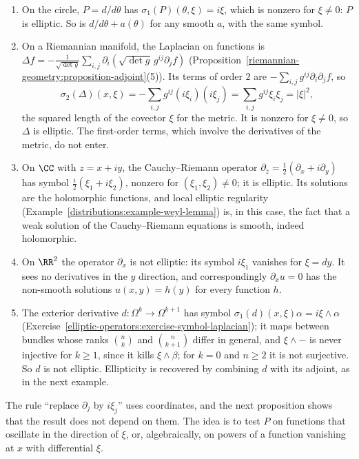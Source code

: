 \begin{example}\label{elliptic-operators:example-symbol-computations}
\begin{enumerate}
\item On the circle, $P = d/d\theta$ has $\sigma_1(P)(\theta, \xi) = i\xi$, which is nonzero for $\xi \neq 0$: $P$ is elliptic. So is $d/d\theta + a(\theta)$ for any smooth $a$, with the same symbol.
\item On a Riemannian manifold, the Laplacian on functions is $\Delta f = -\frac{1}{\sqrt{\det g}}\sum_{i,j}\partial_i(\sqrt{\det g}\,g^{ij}\partial_jf)$
(Proposition~\ref{riemannian-geometry:proposition-adjoint}(5)). Its terms of order $2$ are $-\sum_{i,j}g^{ij}\partial_i\partial_jf$, so
\[
\sigma_2(\Delta)(x, \xi) = -\sum_{i,j}g^{ij}(i\xi_i)(i\xi_j) = \sum_{i,j}g^{ij}\xi_i\xi_j = |\xi|^2,
\]
the squared length of the covector $\xi$ for the metric. It is nonzero for $\xi \neq 0$, so $\Delta$ is elliptic. The first-order terms, which involve the derivatives of the metric, do not enter.
\item On $\CC$ with $z = x + iy$, the Cauchy--Riemann operator $\partial_{\bar z} = \frac12(\partial_x + i\partial_y)$ has symbol $\frac i2(\xi_1 + i\xi_2)$, nonzero for $(\xi_1, \xi_2) \neq 0$; it is elliptic. Its
solutions are the holomorphic functions, and local elliptic regularity (Example~\ref{distributions:example-weyl-lemma}) is, in this case, the fact that a weak solution of the
Cauchy--Riemann equations is smooth, indeed holomorphic.
\item On $\RR^2$ the operator $\partial_x$ is not elliptic: its symbol $i\xi_1$ vanishes for $\xi = dy$. It sees no derivatives in the $y$ direction, and correspondingly $\partial_xu = 0$ has the
non-smooth solutions $u(x, y) = h(y)$ for every function $h$.
\item The exterior derivative $d \colon \Omega^k \to \Omega^{k+1}$ has symbol $\sigma_1(d)(x, \xi)\alpha = i\xi \wedge \alpha$ (Exercise~\ref{elliptic-operators:exercise-symbol-laplacian}); it maps between bundles
whose ranks $\binom nk$ and $\binom n{k+1}$ differ in general, and $\xi \wedge -$ is never injective for $k \geq 1$, since it kills $\xi \wedge \beta$; for $k = 0$ and $n \geq 2$ it is not surjective.
So $d$ is not elliptic. Ellipticity is recovered by combining $d$ with its adjoint, as in the next example.
\end{enumerate}
\end{example}

The rule ``replace $\partial_j$ by $i\xi_j$'' uses coordinates, and the next proposition shows that the result does not depend on them. The idea is to test $P$ on functions that oscillate in the
direction of $\xi$, or, algebraically, on powers of a function vanishing at $x$ with differential $\xi$.

